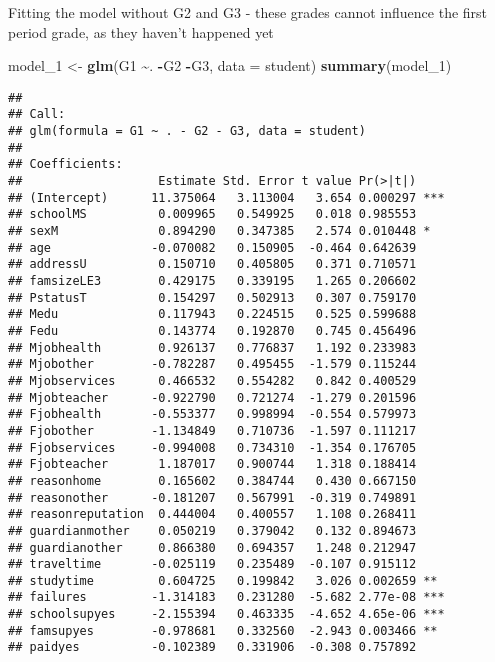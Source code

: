 \documentclass[
]{article}
\newenvironment{Shaded}{\begin{snugshade}}{\end{snugshade}}
\newcommand{\AttributeTok}[1]{\textcolor[rgb]{0.13,0.29,0.53}{#1}}
\newcommand{\FunctionTok}[1]{\textcolor[rgb]{0.13,0.29,0.53}{\textbf{#1}}}
\newcommand{\NormalTok}[1]{#1}
\newcommand{\OtherTok}[1]{\textcolor[rgb]{0.56,0.35,0.01}{#1}}
\newcommand{\SpecialCharTok}[1]{\textcolor[rgb]{0.81,0.36,0.00}{\textbf{#1}}}
\begin{document}
Fitting the model without G2 and G3 - these grades cannot influence the
first period grade, as they haven't happened yet

\begin{Shaded}
\begin{Highlighting}[]
\NormalTok{model\_1 }\OtherTok{\textless{}{-}} \FunctionTok{glm}\NormalTok{(G1 }\SpecialCharTok{\textasciitilde{}}\NormalTok{. }\SpecialCharTok{{-}}\NormalTok{G2 }\SpecialCharTok{{-}}\NormalTok{G3, }\AttributeTok{data =}\NormalTok{ student)}
\FunctionTok{summary}\NormalTok{(model\_1)}
\end{Highlighting}
\end{Shaded}

\begin{verbatim}
## 
## Call:
## glm(formula = G1 ~ . - G2 - G3, data = student)
## 
## Coefficients:
##                   Estimate Std. Error t value Pr(>|t|)    
## (Intercept)      11.375064   3.113004   3.654 0.000297 ***
## schoolMS          0.009965   0.549925   0.018 0.985553    
## sexM              0.894290   0.347385   2.574 0.010448 *  
## age              -0.070082   0.150905  -0.464 0.642639    
## addressU          0.150710   0.405805   0.371 0.710571    
## famsizeLE3        0.429175   0.339195   1.265 0.206602    
## PstatusT          0.154297   0.502913   0.307 0.759170    
## Medu              0.117943   0.224515   0.525 0.599688    
## Fedu              0.143774   0.192870   0.745 0.456496    
## Mjobhealth        0.926137   0.776837   1.192 0.233983    
## Mjobother        -0.782287   0.495455  -1.579 0.115244    
## Mjobservices      0.466532   0.554282   0.842 0.400529    
## Mjobteacher      -0.922790   0.721274  -1.279 0.201596    
## Fjobhealth       -0.553377   0.998994  -0.554 0.579973    
## Fjobother        -1.134849   0.710736  -1.597 0.111217    
## Fjobservices     -0.994008   0.734310  -1.354 0.176705    
## Fjobteacher       1.187017   0.900744   1.318 0.188414    
## reasonhome        0.165602   0.384744   0.430 0.667150    
## reasonother      -0.181207   0.567991  -0.319 0.749891    
## reasonreputation  0.444004   0.400557   1.108 0.268411    
## guardianmother    0.050219   0.379042   0.132 0.894673    
## guardianother     0.866380   0.694357   1.248 0.212947    
## traveltime       -0.025119   0.235489  -0.107 0.915112    
## studytime         0.604725   0.199842   3.026 0.002659 ** 
## failures         -1.314183   0.231280  -5.682 2.77e-08 ***
## schoolsupyes     -2.155394   0.463335  -4.652 4.65e-06 ***
## famsupyes        -0.978681   0.332560  -2.943 0.003466 ** 
## paidyes          -0.102389   0.331906  -0.308 0.757892    

\end{verbatim}
\end{document}
